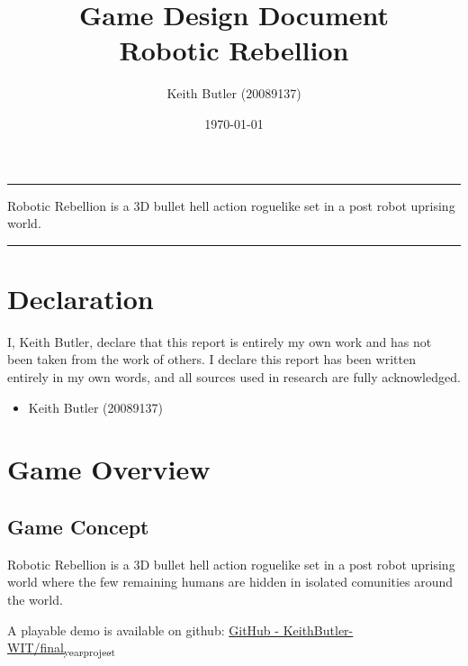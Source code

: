 \documentclass{article}
\author{Keith Butler (20089137)}
\date{\today}
\title{}
\begin{document}
\tableofcontents

\newcommand{\gameName}{Robotic Rebellion}
\newcommand{\shortDescription}{
Robotic Rebellion is a 3D bullet hell action roguelike set in a post robot uprising world.
}

\begin{titlepage}
\begin{center}
\title {
    Game Design Document
    \\
    \vspace{7cm}
    {\huge \gameName}
}

\maketitle
\nopar\noindent\rule{\textwidth}{0.4pt}
\begin{center}\shortDescription\end{center}
\nopar\noindent\rule{\textwidth}{0.4pt}
\vspace{15mm}

\end{center}
\end{titlepage}
\tableofcontents
\section{Declaration}
\label{sec:org4920b6e}
I, Keith Butler, declare that this report is entirely my own work and has not been taken from the work of others. I declare this report has been written entirely in my own words, and all sources used in research are fully acknowledged.
\begin{itemize}
\item Keith Butler (20089137)
\end{itemize}
\section{Game Overview}
\label{sec:org701ab9f}
\subsection{Game Concept}
\label{sec:orgfa6df08}
Robotic Rebellion is a 3D bullet hell action roguelike set in a post robot uprising world where the few remaining humans are hidden in isolated comunities around the world.

A playable demo is available on github: \href{https://github.com/KeithButler-WIT/final\_year\_project}{GitHub - KeithButler-WIT/final\textsubscript{year}\textsubscript{project}}
\end{document}
